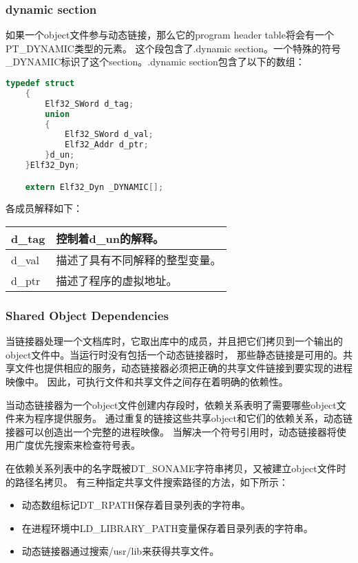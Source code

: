 \documentclass[a4paper,left=2.5cm,right=2.5cm,11pt]{article}
\newcommand{\interval}{\vspace{0.5em}}
\begin{document}
\subsubsection{dynamic section}
	如果一个object文件参与动态链接，那么它的program header table将会有一个PT\_DYNAMIC类型的元素。
	这个段包含了.dynamic section。一个特殊的符号\_DYNAMIC标识了这个section。.dynamic section包含了以下的数组：
	\begin{lstlisting}[language = C]
	typedef struct
	{
		Elf32_SWord d_tag;
		union
		{
			Elf32_SWord d_val;
			Elf32_Addr d_ptr;
		}d_un;
	}Elf32_Dyn;

	extern Elf32_Dyn _DYNAMIC[];
	\end{lstlisting}

	各成员解释如下：
	\interval
	\begin{longtable}{p{2cm}p{8cm}}
	\hline
	d\_tag & 控制着d\_un的解释。\\
	\hline
	d\_val & 描述了具有不同解释的整型变量。\\
	\hline
	d\_ptr & 描述了程序的虚拟地址。\\
	\hline
	\end{longtable}
	\interval

\subsubsection{Shared Object Dependencies}
	当链接器处理一个文档库时，它取出库中的成员，并且把它们拷贝到一个输出的object文件中。当运行时没有包括一个动态链接器时，
	那些静态链接是可用的。共享文件也提供相应的服务，动态链接器必须把正确的共享文件链接到要实现的进程映像中。
	因此，可执行文件和共享文件之间存在着明确的依赖性。\par
	当动态链接器为一个object文件创建内存段时，依赖关系表明了需要哪些object文件来为程序提供服务。
	通过重复的链接这些共享object和它们的依赖关系，动态链接器可以创造出一个完整的进程映像。
	当解决一个符号引用时，动态链接器将使用广度优先搜索来检查符号表。\par
	在依赖关系列表中的名字既被DT\_SONAME字符串拷贝，又被建立object文件时的路径名拷贝。
	有三种指定共享文件搜索路径的方法，如下所示：
	\begin{itemize}
		\item 动态数组标记DT\_RPATH保存着目录列表的字符串。
		\item 在进程环境中LD\_LIBRARY\_PATH变量保存着目录列表的字符串。
		\item 动态链接器通过搜索/usr/lib来获得共享文件。
	\end{itemize}
\end{document}
